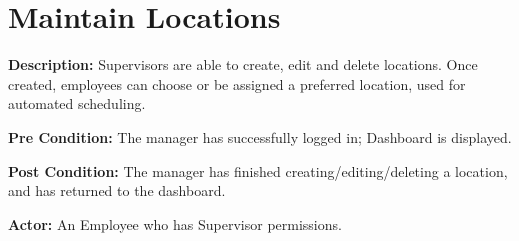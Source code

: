 \documentclass[letterpaper,12pt]{report}
\begin{document}

\pagebreak
\section{Maintain Locations}
\begin{description}
 \item \textbf{Description:} \newline Supervisors are able to create, edit and delete locations.  Once created, employees can choose or be assigned a preferred location, used for automated scheduling.
 \item \textbf{Pre Condition:} \newline The manager has successfully logged in; Dashboard is displayed.
 \item \textbf{Post Condition:} \newline The manager has finished creating/editing/deleting a location, and has returned to the dashboard.
 \item \textbf{Actor:} \newline  An Employee who has Supervisor permissions.
\end{description}
\end{document}
